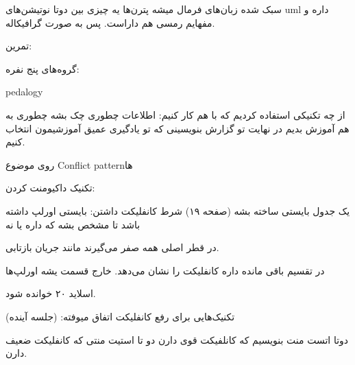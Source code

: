 سبک شده زبان‌های فرمال میشه پترن‌ها یه چیزی بین دوتا نوتیشن‌های uml داره و
مفهایم رمسی هم داراست. پس به صورت گرافیکاله.

تمرین:

گروه‌های پنج نفره:

pedalogy

از چه تکنیکی استفاده کردیم که با هم کار کنیم:
اطلاعات چطوری چک بشه
چطوری به هم آموزش بدیم
در نهایت تو گزارش بنویسینی که تو یادگیری عمیق آموزشیمون انتخاب کنیم.

روی موضوع Conflict pattern‌ها

تکنیک داکیومنت کردن:

یک جدول بایستی ساخته بشه (صفحه ۱۹)
شرط کانفلیکت داشتن: بایستی اورلپ داشته باشد تا مشخص بشه که داره یا نه

در قطر اصلی همه صفر می‌گیرند مانند جریان بازتابی.

در تقسیم باقی مانده داره کانفلیکت را نشان می‌دهد. خارج قسمت یشه اورلپ‌ها


اسلاید ۲۰ خوانده شود.

تکنیک‌هایی برای رفع کانفلیکت اتفاق میوفته: (جلسه آینده)

دوتا اتست منت بنویسیم که کانلفیکت قوی دارن
دو تا استیت منتی که کانفلیکت ضعیف دارن.